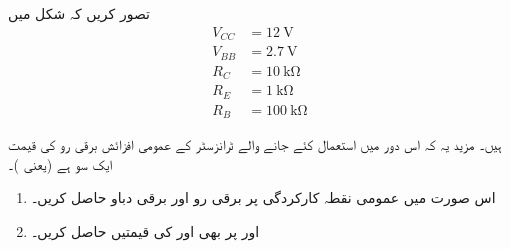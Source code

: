  
تصور کریں کہ شکل   میں
\begin{align*} 
V_{CC}&=\SI{12}{\volt}\\ 
V_{BB}&=\SI{2.7}{\volt}\\ 
R_C&=\SI{10}{\kilo \ohm}\\ 
R_E&=\SI{1}{\kilo \ohm} \\ 
R_B &=\SI{100}{\kilo \ohm}  
\end{align*}

ہیں۔ مزید یہ کہ اس دور میں استعمال کئے جانے والے ٹرانزسٹر کے عمومی افزائش برقی رو   کی قیمت ایک سو ہے (یعنی )۔

\begin{enumerate}
\item
اس صورت میں عمومی نقطہ کارکردگی پر برقی رو  اور برقی دباو   حاصل کریں۔
\item
{} اور  پر بھی  اور  کی قیمتیں حاصل کریں۔
\end{enumerate}


